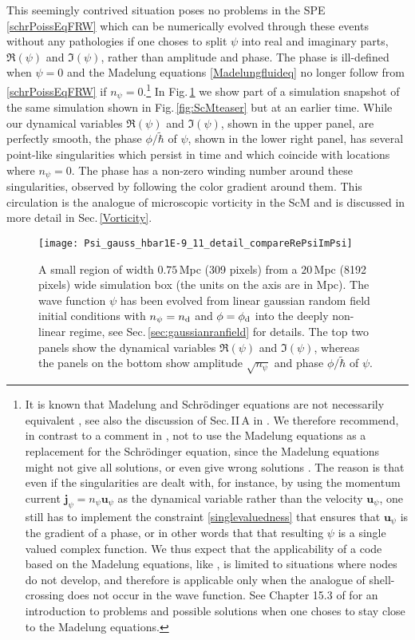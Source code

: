 \documentclass[twocolumn, nofootinbib, showpacs, superscriptaddress]{revtex4-1}
\newcommand{\thbar}{\tilde\hbar}
\renewcommand{\d}[0]{{\rm{d}}}
\renewcommand{\v}[1]{\bm{#1} }
\newcommand{\vu}[0]{\bm{u} }
\newcommand{\npsi}{n_\psi}
\begin{document}
This seemingly contrived situation poses no problems in the SPE \eqref{schrPoissEqFRW} which can be numerically evolved through these events 
without any pathologies if one choses to split $\psi$ into real and imaginary parts,  $\Re(\psi)$ and $\Im(\psi)$, rather than amplitude and phase. 
The phase is ill-defined when $\psi=0$ and the Madelung equations \eqref{Madelungfluideq} no longer follow from 
\eqref{schrPoissEqFRW} if $\npsi=0$.\footnote{It is known that Madelung and Schr\"odinger equations are not necessarily 
equivalent \cite{Wallstrom1994}, see also the discussion of Sec.\,II\,A in \cite{SRvB89}. 
We therefore recommend, in contrast to a comment in \cite{HuiOstrikerTremaineEtal2016}, not to use the Madelung equations as a replacement for the Schr\"odinger equation, since the Madelung equations might not give all solutions, or even give wrong solutions  \cite{Wallstrom1994}. 
The reason is that even if the singularities \cite{SRvB89,UhlemannKoppHaugg2014} are dealt with, for instance, 
by using the momentum current $\v{j}_\psi= n_\psi \vu_\psi$ as the dynamical variable  rather than the velocity  $\vu_\psi$, 
one still has to implement the constraint \eqref{singlevaluedness} that ensures that $\vu_\psi$ is the gradient of a phase, 
or in other words that that resulting $\psi$ is a single valued complex function.  We thus expect that the applicability of a code 
based on the Madelung equations, like \cite{MoczSucci2015}, is limited to situations where nodes do not develop, and 
therefore is applicable only when the analogue of shell-crossing does not occur in the wave function. 
See Chapter 15.3 of \cite{TrahanWyatt2005} for an introduction to problems and possible solutions when one choses to stay close to the Madelung equations.}
In Fig.\,\ref{fig:compareRePsiImPsi} we show part of a simulation snapshot of the same simulation shown in Fig.\,\ref{fig:ScMteaser} but at an earlier time.
While our dynamical variables  $\Re(\psi)$ and $\Im(\psi)$, shown in the upper panel, are perfectly smooth, 
 the phase $\phi/\thbar$ of $\psi$, shown in the lower right panel, has several point-like singularities which persist in time 
and which coincide with locations where $n_\psi=0$. 
The phase has a non-zero winding number around these singularities, observed by following the color gradient around them.
 This circulation is the analogue of microscopic vorticity in the ScM and is discussed in more detail in Sec.\,\ref{Vorticity}.
\begin{figure}[t]
    \centering
    \texttt{[image: Psi\_gauss\_hbar1E-9\_11\_detail\_compareRePsiImPsi]}
    \caption{A small region of width $0.75\,$Mpc (309 pixels) from a $20\,$Mpc (8192 pixels) wide simulation box (the units on the axis are in Mpc). 
 The wave function $\psi$ has been evolved from linear gaussian random field initial conditions with $n_\psi = n_\d$ and $\phi=\phi_\d$ into the deeply non-linear regime, see Sec.\,\ref{sec:gaussianranfield} for details. 
    The top two panels show the dynamical variables $\Re(\psi)$ and $\Im(\psi)$, whereas the panels on the bottom show amplitude $\sqrt{n_\psi}$ and phase $\phi/\thbar$  of $\psi$.}
    \label{fig:compareRePsiImPsi}
\end{figure}  
\end{document}

